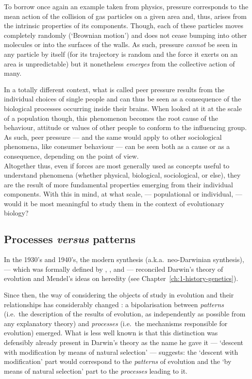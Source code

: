 To borrow once again an example taken from physics, pressure corresponds to the mean action of the collision of gas particles on a given area and, thus, arises from the intrinsic properties of its components.
Though, each of these particles moves completely randomly (‘Brownian motion’) and does not cease bumping into other molecules or into the surfaces of the walls. 
As such, pressure \textit{cannot} be seen in any particle by itself (for its trajectory is random and the force it exerts on an area is unpredictable) but it nonetheless \textit{emerges} from the collective action of many.

In a totally different context, what is called peer pressure results from the individual choices of single people and can thus be seen as a consequence of the biological processes occurring inside their brains.
When looked at it at the scale of a population though, this phenomenon becomes the root cause of the behaviour, attitude or values of other people to conform to the influencing group.
As such, peer pressure — and the same would apply to other sociological phenomena, like consumer behaviour — can be seen both as a cause or as a consequence, depending on the point of view.\\

Altogether thus, even if forces are most generally used as concepts useful to understand phenomena (whether physical, biological, sociological, or else), they are the result of more fundamental properties emerging from their individual components.
With this in mind, at what scale, — populational or individual, — would it be most meaningful to study them in the context of evolutionary biology?





\subsection{Processes \textit{versus} patterns} 

In the 1930's and 1940's, the modern synthesis (a.k.a.\ neo-Darwinian synthesis), — which was formally defined by \citet{dobzhansky1937genetic}, \citet{huxley1942evolution}, \citet{mayr1942systematics} and \citet{simpson1944tempo} — reconciled Darwin's theory of evolution and Mendel's ideas on heredity (see Chapter~\ref{ch:1-history-genetics}).

Since then, the way of considering the objects of study in evolution and their relationships has considerably changed \citep[reviewed in][]{paulin2015epistemologie}: a bipolarisation between \textit{patterns} (i.e.\ the description of the results of evolution, as independently as possible from any explanatory theory) and \textit{processes} (i.e.\ the mechanisms responsible for evolution) emerged.
What is less well known is that this distinction was defensibly already present in Darwin's theory \citep{gayon2018connaissance} as the name he gave it — ‘descent with modification by means of natural selection’ — suggests: the ‘descent with modification’ part would correspond to the \textit{patterns} of evolution and the ‘by means of natural selection’ part to the \textit{processes} leading to it.


